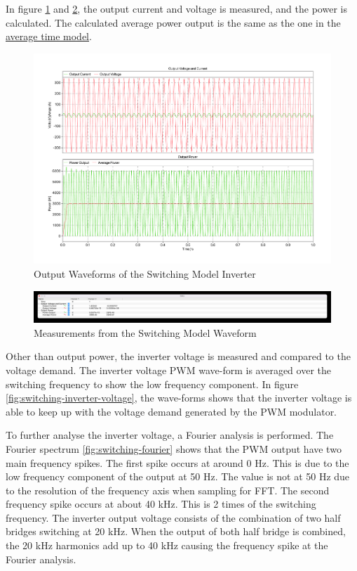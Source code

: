 \documentclass[12pt]{article}
\begin{document}
In figure \ref{fig:switching-waveform} and \ref{fig:switching-cursor}, the output current and voltage is measured, and the power is calculated.
The calculated average power output is the same as the one in the \hyperref[sec:avg-time-model]{average time model}.

\begin{figure}[ht]
    \centering{}
    \includegraphics[width=\textwidth, height=0.4\textheight, keepaspectratio]{img/Switching Power.pdf}
    \caption{Output Waveforms of the Switching Model Inverter}
    \label{fig:switching-waveform}
\end{figure}

\begin{figure}[ht]
    \centering{}
    \includegraphics[width=\textwidth, height=0.4\textheight, keepaspectratio]{img/Switching Power Cursor.jpg}
    \caption{Measurements from the Switching Model Waveform}
    \label{fig:switching-cursor}
\end{figure}

Other than output power, the inverter voltage is measured and compared to the voltage demand.
The inverter voltage PWM wave-form is averaged over the switching frequency to show the low frequency component.
In figure \ref{fig:switching-inverter-voltage}, the wave-forms shows that the inverter voltage is able to keep up with the voltage demand generated by the PWM modulator.

To further analyse the inverter voltage, a Fourier analysis is performed.
The Fourier spectrum \ref{fig:switching-fourier} shows that the PWM output have two main frequency spikes.
The first spike occurs at around 0 Hz.
This is due to the low frequency component of the output at 50 Hz.
The value is not at 50 Hz due to the resolution of the frequency axis when sampling for FFT.
The second frequency spike occurs at about 40 kHz.
This is 2 times of the switching frequency.
The inverter output voltage consists of the combination of two half bridges switching at 20 kHz.
When the output of both half bridge is combined, the 20 kHz harmonics add up to 40 kHz causing the frequency spike at the Fourier analysis.
\end{document}
